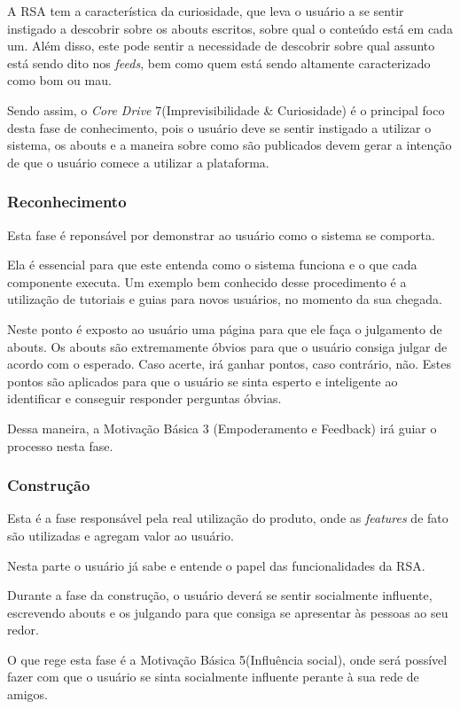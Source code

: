 A RSA tem a característica da curiosidade, que leva o usuário a se sentir instigado
a descobrir sobre os abouts escritos, sobre qual o conteúdo está  em cada
um. Além disso, este pode sentir a necessidade de descobrir sobre qual assunto está
sendo dito nos \textit{feeds}, bem como quem está sendo altamente caracterizado como bom ou mau.

Sendo assim, o \textit{Core Drive} 7(Imprevisibilidade \& Curiosidade) é o principal foco desta fase
de conhecimento, pois o usuário deve se sentir instigado a utilizar o sistema, os abouts
e a maneira sobre como são publicados  devem gerar a intenção de que o usuário comece a utilizar
a plataforma.


\subsubsection{Reconhecimento}
\label{sub:reconhecimento}
Esta fase é reponsável por demonstrar ao usuário como o sistema se comporta.

Ela é essencial para que este entenda como o sistema funciona e o que cada
componente executa. Um exemplo bem conhecido desse procedimento é a utilização
de tutoriais e guias para novos usuários, no momento da sua chegada.

Neste ponto é exposto ao usuário uma página para que ele faça o julgamento de 
abouts.
Os abouts são extremamente óbvios para que o usuário consiga julgar de acordo 
com o
esperado. Caso acerte, irá ganhar pontos, caso contrário, não. Estes pontos
são aplicados para que o usuário se sinta esperto e inteligente ao 
identificar e conseguir responder perguntas óbvias.

Dessa maneira, a Motivação Básica 3 (Empoderamento e Feedback) irá guiar o
processo nesta fase.

\subsubsection{Construção}
\label{sub:constru_o}
Esta é a fase responsável pela real utilização do produto, onde as \textit{features}
de fato são utilizadas e agregam valor ao usuário.

Nesta parte o usuário já sabe e entende o papel das funcionalidades da RSA.

Durante a fase da construção, o usuário deverá se sentir socialmente influente,
escrevendo abouts e os julgando para que consiga se apresentar às pessoas ao seu redor.

O que rege esta fase é a Motivação Básica 5(Influência social), onde será possível
fazer com que o usuário se sinta socialmente influente perante à sua rede de amigos.

